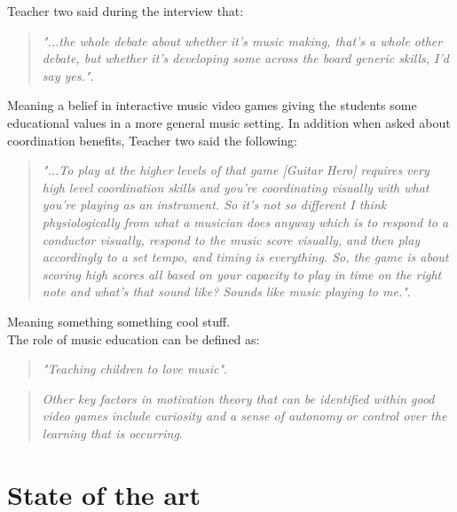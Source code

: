 	Teacher two said during the interview that:
	\begin{quote}
		\textit{"...the whole debate about whether it’s music making, that’s a whole other debate, but whether it’s developing some across the board generic skills, I’d say yes."}\cite[p.~98]{interactiveMusicVideoGames}.\\
	\end{quote}
	Meaning a belief in interactive music video games giving the students some educational values in a more general music setting. In addition when asked about coordination benefits, Teacher two said the following:
	\begin{quote}
		\textit{"...To play at the higher levels of that game [Guitar Hero] requires very high level coordination skills and you’re coordinating visually with what you’re playing as an instrument. So it’s not so different I think physiologically from what a musician does anyway which is to respond to a conductor visually, respond to the music score visually, and then play accordingly to a set tempo, and timing is everything. So, the game is about scoring high scores all based on your capacity to play in time on the right note and what’s that sound like? Sounds like music playing to me."}\cite[p.~98]{interactiveMusicVideoGames}.\\
	\end{quote}
	
	Meaning something something cool stuff.\\
	
	The role of music education can be defined as:
	\begin{quote}
		\textit{"Teaching children to love music"}\cite[p.~94]{interactiveMusicVideoGames}.\\
	\end{quote}
	
	\begin{quote}
		\textit{Other key factors in motivation theory that can be identified within good video games include curiosity and a sense of autonomy or control over the learning that is occurring}\cite[p.~92]{interactiveMusicVideoGames}.\\
	\end{quote}
	
	\cite{constructivism}

\section{State of the art}\label{sec:sota}
